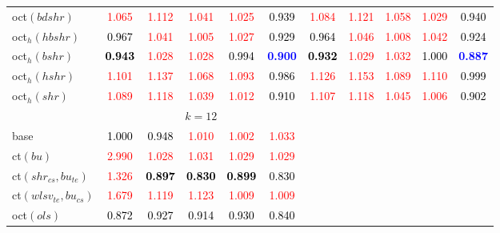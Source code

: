 \begin{tabular}[t]{l|>{}cccc>{}c|ccccc}
oct$(bdshr)$ & \textcolor{red}{1.065} & \textcolor{red}{1.112} & \textcolor{red}{1.041} & \textcolor{red}{1.025} & \textcolor{black}{0.939} & \textcolor{red}{1.084} & \textcolor{red}{1.121} & \textcolor{red}{1.058} & \textcolor{red}{1.029} & \textcolor{black}{0.940}\\
oct$_h(hbshr)$ & \textcolor{black}{0.967} & \textcolor{red}{1.041} & \textcolor{red}{1.005} & \textcolor{red}{1.027} & \textcolor{black}{0.929} & \textcolor{black}{0.964} & \textcolor{red}{1.046} & \textcolor{red}{1.008} & \textcolor{red}{1.042} & \textcolor{black}{0.924}\\
oct$_h(bshr)$ & \textcolor{black}{\textbf{0.943}} & \textcolor{red}{1.028} & \textcolor{red}{1.028} & \textcolor{black}{0.994} & \textcolor{blue}{\textbf{0.900}} & \textcolor{black}{\textbf{0.932}} & \textcolor{red}{1.029} & \textcolor{red}{1.032} & \textcolor{black}{1.000} & \textcolor{blue}{\textbf{0.887}}\\
oct$_h(hshr)$ & \textcolor{red}{1.101} & \textcolor{red}{1.137} & \textcolor{red}{1.068} & \textcolor{red}{1.093} & \textcolor{black}{0.986} & \textcolor{red}{1.126} & \textcolor{red}{1.153} & \textcolor{red}{1.089} & \textcolor{red}{1.110} & \textcolor{black}{0.999}\\
oct$_h(shr)$ & \textcolor{red}{1.089} & \textcolor{red}{1.118} & \textcolor{red}{1.039} & \textcolor{red}{1.012} & \textcolor{black}{0.910} & \textcolor{red}{1.107} & \textcolor{red}{1.118} & \textcolor{red}{1.045} & \textcolor{red}{1.006} & \textcolor{black}{0.902}\\
\addlinespace[0.3em]
\multicolumn{1}{c}{} & \multicolumn{5}{c}{\textbf{$k = 12$}} & \multicolumn{5}{c}{}\\
base & \textcolor{black}{1.000} & \textcolor{black}{0.948} & \textcolor{red}{1.010} & \textcolor{red}{1.002} & \textcolor{red}{1.033} &  &  &  &  & \\
ct$(bu)$ & \textcolor{red}{2.990} & \textcolor{red}{1.028} & \textcolor{red}{1.031} & \textcolor{red}{1.029} & \textcolor{red}{1.029} &  &  &  &  & \\
ct$(shr_{cs}, bu_{te})$ & \textcolor{red}{1.326} & \textcolor{black}{\textbf{0.897}} & \textcolor{black}{\textbf{0.830}} & \textcolor{black}{\textbf{0.899}} & \textcolor{black}{0.830} &  &  &  &  & \\
ct$(wlsv_{te}, bu_{cs})$ & \textcolor{red}{1.679} & \textcolor{red}{1.119} & \textcolor{red}{1.123} & \textcolor{red}{1.009} & \textcolor{red}{1.009} &  &  &  &  & \\
oct$(ols)$ & \textcolor{black}{0.872} & \textcolor{black}{0.927} & \textcolor{black}{0.914} & \textcolor{black}{0.930} & \textcolor{black}{0.840} &  &  &  &  & \\

\end{tabular}
